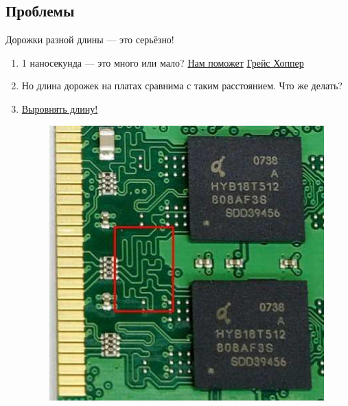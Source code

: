 \documentclass[xetex,aspectratio=43]{beamer}
\begin{document}
\subsection{Проблемы }

\begin{frame}{Дорожки разной длины --- это серьёзно!}
    \begin{enumerate}
        \item 1 наносекунда --- это много или мало? \href{https://youtu.be/gYqF6-h9Cvg}{Нам поможет} \href{https://en.wikipedia.org/wiki/Grace_Hopper}{Грейс Хоппер}
        \pause
        \item Но длина дорожек на платах сравнима с таким расстоянием. Что же делать?
        \pause
        \item \href{https://www.electromaker.io/blog/article/7-ways-to-quickly-judge-the-quality-of-your-printed-circuit-board-pcb-design}{Выровнять длину!}
        \begin{figure}
            \includegraphics[height=0.5\textheight]{img/03.length_equiv.jpg}
        \end{figure}
    \end{enumerate}
\end{frame}


\section*{}
\end{document}
